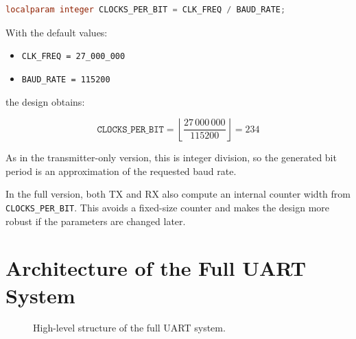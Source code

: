 \documentclass[12pt]{article}
\begin{document}
\begin{lstlisting}[language=Verilog]
localparam integer CLOCKS_PER_BIT = CLK_FREQ / BAUD_RATE;
\end{lstlisting}

With the default values:

\begin{itemize}
    \item \texttt{CLK\_FREQ = 27\_000\_000}
    \item \texttt{BAUD\_RATE = 115200}
\end{itemize}

the design obtains:

\[
\texttt{CLOCKS\_PER\_BIT} =
\left\lfloor \frac{27\,000\,000}{115200} \right\rfloor = 234
\]

As in the transmitter-only version, this is integer division, so the generated
bit period is an approximation of the requested baud rate.

In the full version, both TX and RX also compute an internal counter width from
\texttt{CLOCKS\_PER\_BIT}. This avoids a fixed-size counter and makes the design
more robust if the parameters are changed later.

\section{Architecture of the Full UART System}

\begin{figure}[h!]
\centering
{}
\caption{High-level structure of the full UART system.}
\end{figure}
\end{document}
